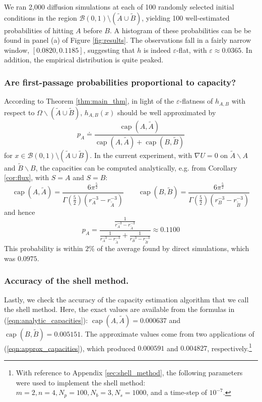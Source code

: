 \documentclass[12pt, nofootinbib,english, amsmath, amssymb, aps, priprint, graphicx,floatfix]{revtex4-1}
\theoremstyle{plain}
\theoremstyle{definition}
\theoremstyle{plain}
\newcommand{\capac}[2]{\ensuremath{\operatorname{cap}}(#1,#2)}
\newcommand{\tA}{{\tilde A}}
\newcommand{\tB}{{\tilde B}}
\begin{document}
We ran 2,000 diffusion simulations at each of 100 randomly selected initial conditions in the region $\mathcal{B}(0, 1) \setminus (\tilde{A} \cup \tilde{B})$, yielding 100 well-estimated probabilities of hitting $A$ before $B$. A histogram of these probabilities can be be found in panel (a) of Figure \ref{fig:results}. The observations fall in a fairly narrow window, $[0.0820, 0.1185]$, suggesting that $h$ is indeed $\varepsilon$-flat, with $\varepsilon \approx 0.0365$. In addition, the empirical distribution is quite peaked.

\subsubsection{Are first-passage probabilities proportional to capacity?}
\label{sec:toy_capacity}
According to Theorem \ref{thm:main_thm},
in light of the $\varepsilon$-flatness of 
$h_{A,B}$  with respect to $\Omega\backslash(\tA\cup\tB)$, 
$h_{A,B}(x)$ should be well approximated by 
\begin{equation}
\label{eqn:capacity_ratio}
p_A \doteq \frac{\capac{A}{\tA}}{\capac{A}{\tA}+\capac{B}{\tB}}
\end{equation}
for $x\in 
\mathcal{B}(0, 1) \setminus (\tilde{A} \cup \tilde{B})$. 
In the current experiment, with $\nabla U=0$ on 
$\tA\backslash A$ and $\tB\backslash B$, the capacities can be computed analytically, e.g. from Corollary \ref{cor:flux}, 
with $S=A$ and $S=B$:
\begin{equation}
\label{eqn:analytic_capacities}
\capac{A}{\tA}  =
\frac{6\pi^{\frac{5}{2}}}
{\Gamma(\frac{5}{2})(r_A^{-3} - r_\tA^{-3})}  \qquad
\capac{B}{\tB}  =
\frac{6\pi^{\frac{5}{2}}}
{\Gamma(\frac{5}{2})(r_B^{-3} - r_\tB^{-3})}
\end{equation}
and hence 
\begin{equation*}
p_A = \frac{\frac{1}{r_A^{-3} - r_{\tilde{A}}^{-3}}}{\frac{1}{r_A^{-3} - r_{\tilde{A}}^{-3}} + \frac{1}{r_B^{-3} - r_{\tilde{B}}^{-3}}}
\approx 0.1100
\end{equation*}
This probability is within $2\%$ of the average found by direct simulations, which was $0.0975$. 

\subsubsection{Accuracy of the shell method.}
\label{sec:toy_shell}
Lastly, we check the accuracy of the capacity estimation algorithm that we call the shell method. Here, the exact values are available from the formulas in (\ref{eqn:analytic_capacities}):
$\capac{A}{\tA}=0.000637$ and $\capac{B}{\tB}=0.005151$. 
The approximate values come from two applications of (\ref{eqn:approx_capacities}), which produced $0.000591$ and $0.004827$, respectively.\footnote{With reference to Appendix \ref{sec:shell_method}, the following parameters were used to implement the shell method:
$m = 2, n = 4, N_p = 100, N_b = 3, N_s = 1000$, and a time-step of 
$10^{-7}$.}
\end{document}
